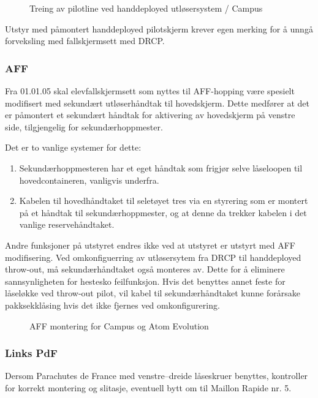 \begin{figure}
	\caption{Treing av pilotline ved handdeployed utløsersystem / Campus}
\end{figure}

Utstyr med påmontert handdeployed pilotskjerm krever egen merking for å unngå forveksling med fallskjermsett med DRCP.

\subsubsection{AFF}
Fra 01.01.05 skal elevfallskjermsett som nyttes til AFF-hopping være spesielt modifisert med sekundært utløserhåndtak til hovedskjerm. Dette medfører at det er påmontert et sekundært håndtak for aktivering av hovedskjerm på venstre side, tilgjengelig for sekundærhoppmester.

Det er to vanlige systemer for dette:
\begin{enumerate}
	\item Sekundærhoppmesteren har et eget håndtak som frigjør selve låseloopen til hovedcontaineren, vanligvis underfra.
	\item Kabelen til hovedhåndtaket til seletøyet tres via en styrering som er montert på et håndtak til sekundærhoppmester, og at denne da trekker kabelen i det vanlige reservehåndtaket.
\end{enumerate}

Andre funksjoner på utstyret endres ikke ved at utstyret er utstyrt med AFF modifisering. Ved omkonfiguerring av utløsersytem fra DRCP til handdeployed throw-out, må sekundærhåndtaket også monteres av. Dette for å eliminere sannsynligheten for hestesko feilfunksjon. Hvis det benyttes annet feste for låseløkke ved throw-out pilot, vil kabel til sekundærhåndtaket kunne forårsake pakksekklåsing hvis det ikke fjernes ved omkonfigurering.

\begin{figure}
	\caption{AFF montering for Campus og Atom Evolution}
\end{figure}

\subsubsection{Links PdF}
Dersom Parachutes de France med venstre–dreide låseskruer benyttes, kontroller for korrekt montering og slitasje, eventuell bytt om til Maillon Rapide nr. 5.

